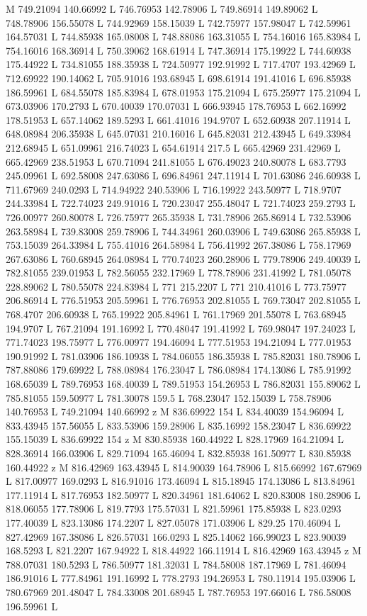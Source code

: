 {\begin{scope}[local bounding box=bb]
{            M 749.21094 140.66992 L 746.76953 142.78906 L 749.86914 149.89062 L 748.78906 156.55078 L 744.92969 158.15039 L 742.75977 157.98047 L 742.59961 164.57031 L 744.85938 165.08008 L 748.88086 163.31055 L 754.16016 165.83984 L 754.16016 168.36914 L 750.39062 168.61914 L 747.36914 175.19922 L 744.60938 175.44922 L 734.81055 188.35938 L 724.50977 192.91992 L 717.4707 193.42969 L 712.69922 190.14062 L 705.91016 193.68945 L 698.61914 191.41016 L 696.85938 186.59961 L 684.55078 185.83984 L 678.01953 175.21094 L 675.25977 175.21094 L 673.03906 170.2793 L 670.40039 170.07031 L 666.93945 178.76953 L 662.16992 178.51953 L 657.14062 189.5293 L 661.41016 194.9707 L 652.60938 207.11914 L 648.08984 206.35938 L 645.07031 210.16016 L 645.82031 212.43945 L 649.33984 212.68945 L 651.09961 216.74023 L 654.61914 217.5 L 665.42969 231.42969 L 665.42969 238.51953 L 670.71094 241.81055 L 676.49023 240.80078 L 683.7793 245.09961 L 692.58008 247.63086 L 696.84961 247.11914 L 701.63086 246.60938 L 711.67969 240.0293 L 714.94922 240.53906 L 716.19922 243.50977 L 718.9707 244.33984 L 722.74023 249.91016 L 720.23047 255.48047 L 721.74023 259.2793 L 726.00977 260.80078 L 726.75977 265.35938 L 731.78906 265.86914 L 732.53906 263.58984 L 739.83008 259.78906 L 744.34961 260.03906 L 749.63086 265.85938 L 753.15039 264.33984 L 755.41016 264.58984 L 756.41992 267.38086 L 758.17969 267.63086 L 760.68945 264.08984 L 770.74023 260.28906 L 779.78906 249.40039 L 782.81055 239.01953 L 782.56055 232.17969 L 778.78906 231.41992 L 781.05078 228.89062 L 780.55078 224.83984 L 771 215.2207 L 771 210.41016 L 773.75977 206.86914 L 776.51953 205.59961 L 776.76953 202.81055 L 769.73047 202.81055 L 768.4707 206.60938 L 765.19922 205.84961 L 761.17969 201.55078 L 763.68945 194.9707 L 767.21094 191.16992 L 770.48047 191.41992 L 769.98047 197.24023 L 771.74023 198.75977 L 776.00977 194.46094 L 777.51953 194.21094 L 777.01953 190.91992 L 781.03906 186.10938 L 784.06055 186.35938 L 785.82031 180.78906 L 787.88086 179.69922 L 788.08984 176.23047 L 786.08984 174.13086 L 785.91992 168.65039 L 789.76953 168.40039 L 789.51953 154.26953 L 786.82031 155.89062 L 785.81055 159.50977 L 781.30078 159.5 L 768.23047 152.15039 L 758.78906 140.76953 L 749.21094 140.66992 z M 836.69922 154 L 834.40039 154.96094 L 833.43945 157.56055 L 833.53906 159.28906 L 835.16992 158.23047 L 836.69922 155.15039 L 836.69922 154 z M 830.85938 160.44922 L 828.17969 164.21094 L 828.36914 166.03906 L 829.71094 165.46094 L 832.85938 161.50977 L 830.85938 160.44922 z M 816.42969 163.43945 L 814.90039 164.78906 L 815.66992 167.67969 L 817.00977 169.0293 L 816.91016 173.46094 L 815.18945 174.13086 L 813.84961 177.11914 L 817.76953 182.50977 L 820.34961 181.64062 L 820.83008 180.28906 L 818.06055 177.78906 L 819.7793 175.57031 L 821.59961 175.85938 L 823.0293 177.40039 L 823.13086 174.2207 L 827.05078 171.03906 L 829.25 170.46094 L 827.42969 167.38086 L 826.57031 166.0293 L 825.14062 166.99023 L 823.90039 168.5293 L 821.2207 167.94922 L 818.44922 166.11914 L 816.42969 163.43945 z M 788.07031 180.5293 L 786.50977 181.32031 L 784.58008 187.17969 L 781.46094 186.91016 L 777.84961 191.16992 L 778.2793 194.26953 L 780.11914 195.03906 L 780.67969 201.48047 L 784.33008 201.68945 L 787.76953 197.66016 L 786.58008 196.59961 L }
\end{scope}}
